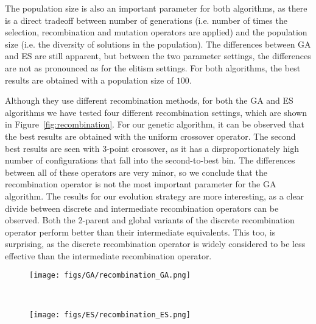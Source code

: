 \documentclass{article}
\begin{document}
The population size is also an important parameter for both algorithms, as there is a direct tradeoff between number of generations (i.e. number of times the selection, recombination and mutation operators are applied) and the population size (i.e. the diversity of solutions in the population).
The differences between GA and ES are still apparent, but between the two parameter settings, the differences are not as pronounced as for the elitism settings.
For both algorithms, the best results are obtained with a population size of $100$.

\newpage

Although they use different recombination methods, for both the GA and ES algorithms we have tested four different recombination settings, which are shown in Figure~\ref{fig:recombination}.
For our genetic algorithm, it can be observed that the best results are obtained with the uniform crossover operator.
The second best results are seen with $3$-point crossover, as it has a disproportionately high number of configurations that fall into the second-to-best bin.
The differences between all of these operators are very minor, so we conclude that the recombination operator is not the most important parameter for the GA algorithm.
The results for our evolution strategy are more interesting, as a clear divide between discrete and intermediate recombination operators can be observed.
Both the 2-parent and global variants of the discrete recombination operator perform better than their intermediate equivalents.
This too, is surprising, as the discrete recombination operator is widely considered to be less effective than the intermediate recombination operator.

\begin{figure*}[htbp]
    \centering
    \begin{subfigure}[b]{0.45\textwidth}
        \centering
        \texttt{[image: figs/GA/recombination\_GA.png]}
        \caption{}
        \label{fig:recombination_GA}
    \end{subfigure}
    ~
    \begin{subfigure}[b]{0.45\textwidth}
        \centering 
        \texttt{[image: figs/ES/recombination\_ES.png]}
        \caption{}
        \label{fig:recombination_ES}
    \end{subfigure}
    \captionsetup{width=.9\textwidth}
    \caption{
        Final function value comparison for all configurations with different recombination operators for the GA (left) and ES (right) algorithm.
    }
    \label{fig:recombination}
\end{figure*}
\end{document}
